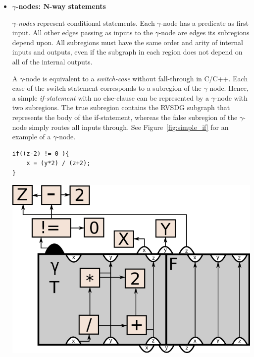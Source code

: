 \begin{itemize}

\item \textbf{$\gamma$-nodes: N-way statements}

\textit{$\gamma$-nodes} represent conditional statements. Each $\gamma$-node has
a predicate as first input. All other edges passing as inputs to the
$\gamma$-node are edges its subregions depend upon. All subregions must have the
same order and arity of internal inputs and outputs, even if the subgraph in
each region does not depend on all of the internal outputs.

A $\gamma$-node is equivalent to a \textit{switch-case} without fall-through in
C/C++. Each case of the switch statement corresponds to a subregion of the
$\gamma$-node. Hence, a simple \textit{if-statement} with no else-clause can be
represented by a $\gamma$-node with two subregions. The true subregion contains
the RVSDG subgraph that represents the body of the if-statement, whereas the
false subregion of the $\gamma$-node simply routes all inputs through. See
Figure~\ref{fig:simple_if} for an example of a $\gamma$-node.

\begin{centering}
	\noindent\begin{minipage}{0.36\textwidth}
		\begin{CenteredBox}
		\begin{lstlisting}[label={lst:simple_if}, style=minipage_customcpp,
basicstyle=\fontsize{14}{1}]
if((z-2) != 0 ){
	x = (y*2) / (z+2);
}
		\end{lstlisting}
		\end{CenteredBox}
	\end{minipage}
	\noindent\begin{minipage}{0.55\textwidth}
		\captionsetup{type=figure}
		\includegraphics[width=\textwidth]{figures/simple_if_example}
	\end{minipage}
	\label{fig:simple_if}
\end{centering}


\end{itemize}
